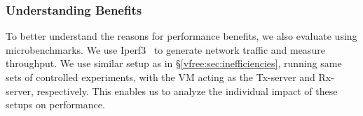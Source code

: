 
\subsubsection{Understanding {\vfreename} Benefits}
\label{vfree:ssec:micro}

To better understand the reasons for {\vfreename} performance benefits, we also evaluate {\vfreename} using microbenchmarks. We use Iperf3~\cite{iperf3} to generate network traffic and measure throughput. We use similar setup as in \S\ref{vfree:sec:inefficiencies}, running same sets of controlled experiments, with the VM acting as the Tx-server and Rx-server, respectively. This enables us to analyze the individual impact of these setups on {\vfreename} performance.



